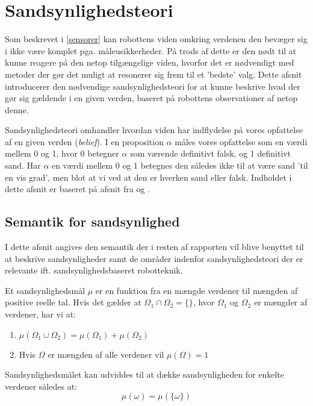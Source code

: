 

\section{Sandsynlighedsteori}
Som beskrevet i \cref{sensorer} kan robottens viden omkring verdenen den bevæger sig i ikke være komplet pga. måleusikkerheder.
På trods af dette er den nødt til at kunne reagere på den netop tilgængelige viden, hvorfor det er nødvendigt med metoder der gør det muligt at resonerer sig frem til et 'bedste' valg.
Dette afsnit introducerer den nødvendige sandsynlighedsteori for at kunne beskrive hvad der gør sig gældende i en given verden, baseret på robottens observationer af netop denne.

Sandsynlighedsteori omhandler hvordan viden har indflydelse på vores opfattelse af en given verden (\textit{belief}).
I en proposition $\alpha$ måles vores opfattelse som en værdi mellem 0 og 1, hvor 0 betegner $\alpha$ som værende definitivt falsk, og 1 definitivt sand.
Har $\alpha$ en værdi mellem 0 og 1 betegnes den således ikke til at være sand 'til en vis grad', men blot at vi ved at den er hverken sand eller falsk.
Indholdet i dette afsnit er baseret på afsnit fra \cite{ArtificialIntelligence} og \cite{probabilisticRobotics}.

\subsection{Semantik for sandsynlighed}
I dette afsnit angives den semantik der i resten af rapporten vil blive benyttet til at beskrive sandsynligheder 
samt de områder indenfor sandsynlighedsteori der er relevante ift. sandsynlighedsbaseret robotteknik.

Et sandsynlighedsmål $\mu$ er en funktion fra en mængde verdener til mængden af positive reelle tal. 
Hvis det gælder at $\Omega_1 \cap \Omega_2 = \{{}\}$, hvor $\Omega_1$ og $\Omega_2$ er mængder af verdener, har vi at:

\begin{enumerate}
\item $\mu(\Omega_1 \cup \Omega_2) = \mu(\Omega_1) + \mu(\Omega_2)$
\item Hvis $\Omega$ er mængden af alle verdener vil $\mu(\Omega) = 1$ 
\end{enumerate}

Sandsynlighedsmålet kan udviddes til at dække sandsynligheden for enkelte verdener således at:
$$\mu(\omega) = \mu(\{\omega\})$$

